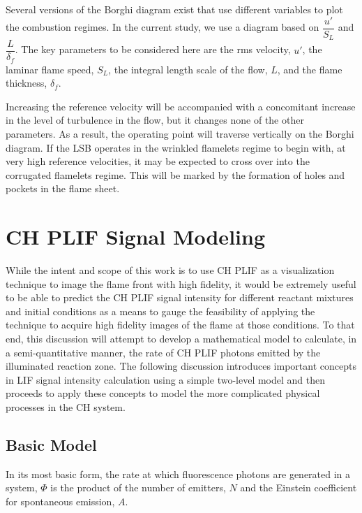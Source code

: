 Several versions of the Borghi diagram exist that use different variables to plot the combustion regimes.
In the current study, we use a diagram based on \(\dfrac{ u' }{ S_L }\) and \(\dfrac{ L }{ \delta_f }\).
The key parameters to be considered here are the rms velocity, \(u'\), the laminar flame speed, \(S_L\), the integral length scale of the flow, \(L\), and the flame thickness, \(\delta_f\).

Increasing the reference velocity will be accompanied with a concomitant increase in the level of turbulence in the flow, but it changes none of the other parameters.
As a result, the operating point will traverse vertically on the Borghi diagram.
If the LSB operates in the wrinkled flamelets regime to begin with, at very high reference velocities, it may be expected to cross over into the corrugated flamelets regime.
This will be marked by the formation of holes and pockets in the flame sheet.

\section{CH PLIF Signal Modeling}
\label{sec:background-chplif-signal-modeling}

While the intent and scope of this work is to use CH PLIF as a visualization technique to image the flame front with high fidelity, it would be extremely useful to be able to predict the CH PLIF signal intensity for different reactant mixtures and initial conditions as a means to gauge the feasibility of applying the technique to acquire high fidelity images of the flame at those conditions.
To that end, this discussion will attempt to develop a mathematical model to calculate, in a semi-quantitative manner, the rate of CH PLIF photons emitted by the illuminated reaction zone.
The following discussion introduces important concepts in LIF signal intensity calculation using a simple two-level model and then proceeds to apply these concepts to model the more complicated physical processes in the CH system.

\subsection{Basic Model}
\label{subsec:chplif-basic-model}

In its most basic form, the rate at which fluorescence photons are generated in a system, \(\Phi\) is the product of the number of emitters, \(N\) and the Einstein coefficient for spontaneous emission, \(A\).

